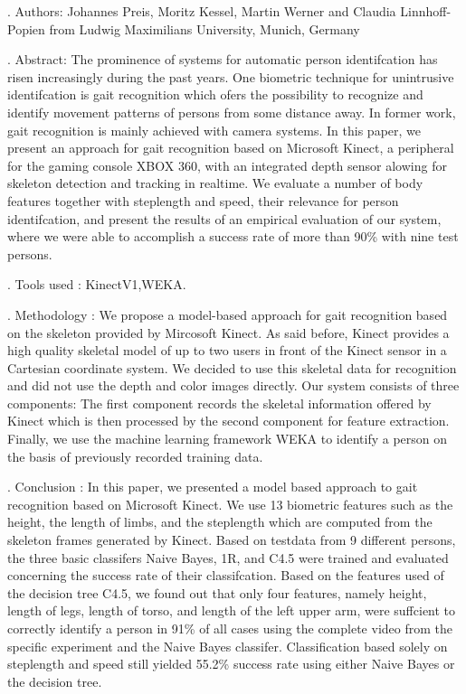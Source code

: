 . Authors:
\noindent Johannes Preis, Moritz Kessel, Martin Werner and Claudia Linnhoff-Popien from Ludwig Maximilians University, Munich, Germany

. Abstract:
\noindent The prominence of systems for automatic person identifcation has risen increasingly during the past years. One biometric technique for unintrusive identifcation is gait recognition which ofers the possibility to recognize and
identify movement patterns of persons from some distance away. In former work, gait recognition is mainly achieved with camera systems. In this paper, we present an approach for gait recognition based on Microsoft Kinect, a peripheral for the gaming console XBOX 360, with an integrated depth sensor alowing for skeleton detection and tracking in realtime. We evaluate a number of body features together with steplength and speed, their relevance for person identifcation, and present the results of an empirical evaluation of our system, where we were able to accomplish a success rate of more than 90\% with nine test persons.

. Tools used :
\noindent KinectV1,WEKA.

. Methodology :
\noindent We propose a model-based approach for gait recognition based on the skeleton provided by Mircosoft Kinect. As said before, Kinect provides a high quality skeletal model of up to two users in front of the Kinect sensor in a Cartesian coordinate system. We decided to use this skeletal data for recognition and did not use the depth and color images directly. Our system consists of three components: The first component records the skeletal information offered by Kinect which is then processed by the second component for feature extraction. Finally, we use the machine learning framework WEKA to identify a person on the basis of previously recorded training data.

. Conclusion :
\noindent In this paper, we presented a model based approach to gait recognition based on Microsoft Kinect. We use 13 biometric features such as the height, the length of limbs, and the steplength which are computed from the skeleton frames generated by Kinect. Based on testdata from 9 different persons, the three basic classifers Naive Bayes, 1R, and C4.5 were trained and evaluated concerning the success rate of their classifcation. Based on the features used of the decision tree C4.5, we found out that only four features, namely height, length of legs, length of torso, and length of the left upper arm, were suffcient to correctly identify a person in 91\% of all cases using the complete video from the specific experiment and the Naive Bayes classifer. Classification based solely on steplength and speed still yielded 55.2\% success rate using either Naive Bayes or the decision tree.
